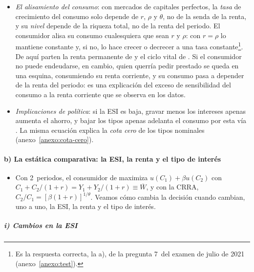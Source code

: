 \documentclass[11pt]{article}
\begin{document}
\begin{itemize}
\begin{itemize}
  \item cuanto mayor es la ESI, $1/\theta$, más responde el crecimiento del consumo a la diferencia entre $r$ y $\rho$. La evidencia apunta a una ESI baja: el crecimiento del consumo apenas responde al tipo de interés real\nocite{Hall1988Intertemporal,CampbellMankiw1989Consumption}.
  \end{itemize}
\item \emph{El alisamiento del consumo}: con mercados de capitales perfectos, la \emph{tasa} de crecimiento del consumo solo depende de $r$, $\rho$ y $\theta$, no de la senda de la renta, y su \emph{nivel} depende de la riqueza total, no de la renta del periodo. El consumidor alisa su consumo cualesquiera que sean $r$ y $\rho$: con $r=\rho$ lo mantiene constante y, si no, lo hace crecer o decrecer a una tasa constante\footnote{Es la respuesta correcta, la a), de la pregunta 7~del examen de julio de 2021 (anexo~\ref{anexo:test}).}. De aquí parten la renta permanente de \textcite{Friedman1957} y el ciclo vital de \textcite{ModiglianiBrumberg1954} . Si el consumidor no puede endeudarse, en cambio, quien querría pedir prestado se queda en una esquina, consumiendo su renta corriente, y su consumo pasa a depender de la renta del periodo: es una explicación del exceso de sensibilidad del consumo a la renta corriente que se observa en los datos.
\item \emph{Implicaciones de política}: si la ESI es baja, gravar menos los intereses apenas aumenta el ahorro, y bajar los tipos apenas adelanta el consumo por esta vía . La misma ecuación explica la \emph{cota cero} de los tipos nominales (anexo~\ref{anexo:cota-cero}).
\end{itemize}

\paragraph{b) La estática comparativa: la ESI, la renta y el tipo de interés}

\begin{itemize}
\item Con 2~periodos, el consumidor de  maximiza $u(C_1)+\beta u(C_2)$ con $C_1+C_2/(1+r)=Y_1+Y_2/(1+r)\equiv\overline W$, y con la CRRA, $C_2/C_1=[\beta(1+r)]^{1/\theta}$. Veamos cómo cambia la decisión cuando cambian, uno a uno, la ESI, la renta y el tipo de interés.
\end{itemize}

\subparagraph{i) Cambios en la ESI}
\end{document}
